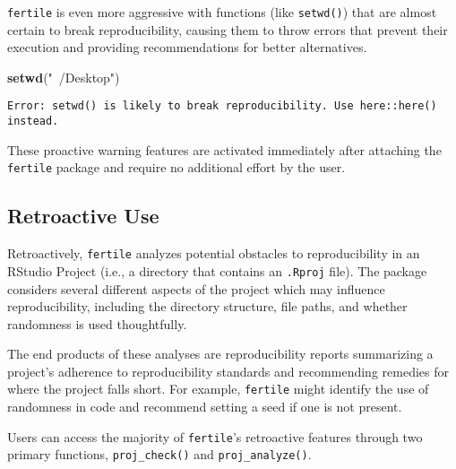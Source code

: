 \documentclass[12pt,twoside]{reedthesis}
\newenvironment{Shaded}{\begin{snugshade}}{\end{snugshade}}
\newcommand{\KeywordTok}[1]{\textcolor[rgb]{0.13,0.29,0.53}{\textbf{#1}}}
\newcommand{\StringTok}[1]{\textcolor[rgb]{0.31,0.60,0.02}{#1}}
\newcommand{\NormalTok}[1]{#1}
\begin{document}
\texttt{fertile} is even more aggressive with functions (like
\texttt{setwd()}) that are almost certain to break reproducibility,
causing them to throw errors that prevent their execution and providing
recommendations for better alternatives.
\begin{Shaded}
\begin{Highlighting}[]
\KeywordTok{setwd}\NormalTok{(}\StringTok{"~/Desktop"}\NormalTok{)}
\end{Highlighting}
\end{Shaded}
\begin{verbatim}
Error: setwd() is likely to break reproducibility. Use here::here() instead.
\end{verbatim}
These proactive warning features are activated immediately after
attaching the \texttt{fertile} package and require no additional effort
by the user.

\subsection{Retroactive Use}\label{retroactive-use}

Retroactively, \texttt{fertile} analyzes potential obstacles to
reproducibility in an RStudio Project (i.e., a directory that contains
an \texttt{.Rproj} file). The package considers several different
aspects of the project which may influence reproducibility, including
the directory structure, file paths, and whether randomness is used
thoughtfully.

The end products of these analyses are reproducibility reports
summarizing a project's adherence to reproducibility standards and
recommending remedies for where the project falls short. For example,
\texttt{fertile} might identify the use of randomness in code and
recommend setting a seed if one is not present.

Users can access the majority of \texttt{fertile}'s retroactive features
through two primary functions, \texttt{proj\_check()} and
\texttt{proj\_analyze()}.
\end{document}
